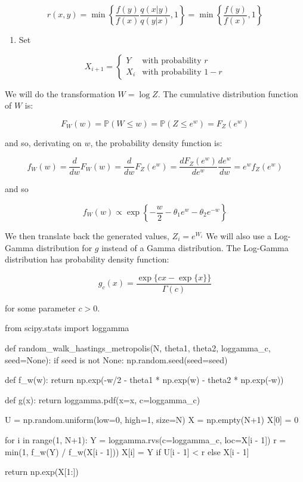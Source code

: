 \[ r(x, y) = \min \left\{ \frac{f(y)}{f(x)} \frac{q(x | y)}{q(y | x)}, 1 \right\} = \min \left\{ \frac{f(y)}{f(x)}, 1 \right\} \]

\begin{enumerate}[tightlist,label={\arabic*.},resume]
\item
  Set
\end{enumerate}

\[
X_{i+1} = \begin{cases}
Y   &\text{with probability } r \\
X_{i} &\text{with probability } 1 - r 
\end{cases}
\]

We will do the transformation \(W = \log Z\). The cumulative
distribution function of \(W\) is:

\[ F_{W}(w) = \mathbb{P}\left( W \leq w \right) = \mathbb{P}\left( Z \leq e^{w} \right) = F_Z(e^{w}) \]

and so, derivating on \(w\), the probability density function is:

\[ f_W(w) = \frac{d}{dw} F_{W}(w) = \frac{d}{dw} F_Z(e^{w}) = \frac{d F_Z(e^{w})}{d e^{w}} \frac{d e^{w}}{ dw } = e^{w} f_Z(e^w) \]

and so

\[ f_W(w) \propto \exp \left\{ -\frac{w}{2}
-\theta_{1} e^{w} - \theta_{2} e^{-w} \right\} \]

We then translate back the generated values, \(Z_{i} = e^{W_{i}}\) We will
also use a Log-Gamma distribution for \(g\) instead of a Gamma
distribution. The Log-Gamma distribution has probability density
function:

\[ g_c(x) = \frac{\exp \{ cx - \exp \{ x \} \}}{\Gamma(c)} \]

for some parameter \(c > 0\).

\begin{python}
from scipy.stats import loggamma

def random_walk_hastings_metropolis(N, theta1, theta2, loggamma_c, seed=None):
    if seed is not None:
        np.random.seed(seed=seed)
        
    def f_w(w):
        return np.exp(-w/2 - theta1 * np.exp(w) - theta2 * np.exp(-w))
        
    def g(x):
        return loggamma.pdf(x=x, c=loggamma_c)
    
    U = np.random.uniform(low=0, high=1, size=N)
    X = np.empty(N+1)
    X[0] = 0
    
    for i in range(1, N+1):
        Y = loggamma.rvs(c=loggamma_c, loc=X[i - 1])
        r = min(1, f_w(Y) / f_w(X[i - 1]))
        X[i] = Y if U[i - 1] < r else X[i - 1]
        
    return np.exp(X[1:])
\end{python}

